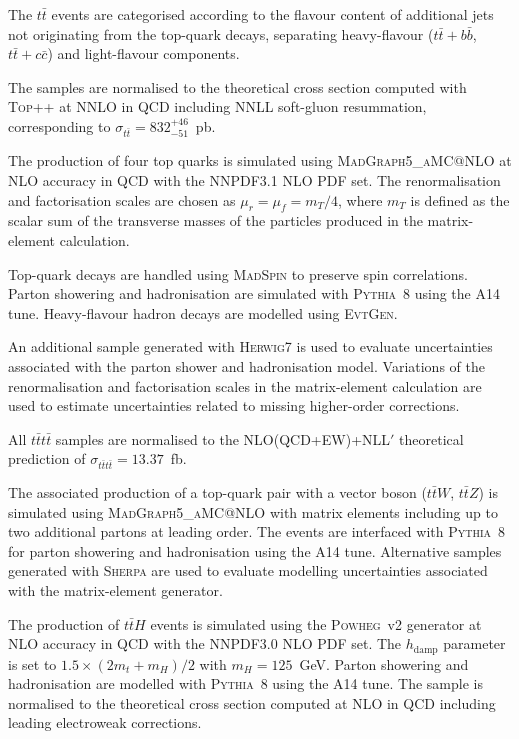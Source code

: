 \begin{description}
The $t\bar{t}$ events are categorised according to the flavour
content of additional jets not originating from the top-quark decays,
separating heavy-flavour ($t\bar{t}+b\bar{b}$, $t\bar{t}+c\bar{c}$)
and light-flavour components.

The samples are normalised to the theoretical cross section
computed with \textsc{Top++} at NNLO in QCD including NNLL
soft-gluon resummation, corresponding to
$\sigma_{t\bar{t}} = 832^{+46}_{-51}$~pb.

\item[\boldmath$t\bar{t}t\bar{t}$:]

The production of four top quarks is simulated using
\textsc{MadGraph5\_aMC@NLO} at NLO accuracy in QCD with the
NNPDF3.1 NLO PDF set.
The renormalisation and factorisation scales are chosen as
$\mu_r=\mu_f=m_T/4$, where $m_T$ is defined as the scalar sum of
the transverse masses of the particles produced in the
matrix-element calculation.

Top-quark decays are handled using \textsc{MadSpin}
to preserve spin correlations.
Parton showering and hadronisation are simulated with
\textsc{Pythia}~8 using the A14 tune.
Heavy-flavour hadron decays are modelled using
\textsc{EvtGen}.

An additional sample generated with \textsc{Herwig7}
is used to evaluate uncertainties associated with the
parton shower and hadronisation model.
Variations of the renormalisation and factorisation scales
in the matrix-element calculation are used to estimate
uncertainties related to missing higher-order corrections.

All $t\bar{t}t\bar{t}$ samples are normalised to the
NLO(QCD+EW)+NLL$'$ theoretical prediction of
$\sigma_{t\bar{t}t\bar{t}} = 13.37$~fb.

\item[\boldmath$t\bar{t}V$:]

The associated production of a top-quark pair with a vector boson
($t\bar{t}W$, $t\bar{t}Z$) is simulated using
\textsc{MadGraph5\_aMC@NLO} with matrix elements including
up to two additional partons at leading order.
The events are interfaced with \textsc{Pythia}~8 for
parton showering and hadronisation using the A14 tune.
Alternative samples generated with \textsc{Sherpa}
are used to evaluate modelling uncertainties associated
with the matrix-element generator.

\item[\boldmath$t\bar{t}H$:]

The production of $t\bar{t}H$ events is simulated using
the \textsc{Powheg}~v2 generator at NLO accuracy in QCD
with the NNPDF3.0 NLO PDF set.
The $h_{\mathrm{damp}}$ parameter is set to
$1.5\times (2m_t+m_H)/2$ with $m_H=125$~GeV.
Parton showering and hadronisation are modelled with
\textsc{Pythia}~8 using the A14 tune.
The sample is normalised to the theoretical cross section
computed at NLO in QCD including leading electroweak corrections.


\end{description}
